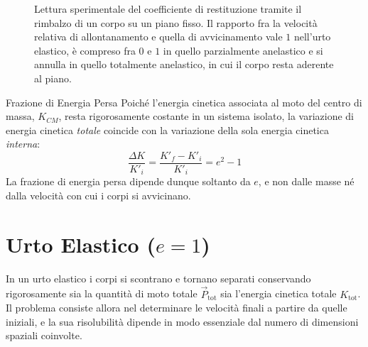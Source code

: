 \begin{figure}[ht]
    \caption{Lettura sperimentale del coefficiente di restituzione tramite il rimbalzo di un corpo su un piano fisso. Il rapporto fra la velocità relativa di allontanamento e quella di avvicinamento vale $1$ nell'urto elastico, è compreso fra $0$ e $1$ in quello parzialmente anelastico e si annulla in quello totalmente anelastico, in cui il corpo resta aderente al piano.}
    \label{fig:tipi_urto}
\end{figure}

\begin{osservazione}{Frazione di Energia Persa}
Poiché l'energia cinetica associata al moto del centro di massa, $K_{CM}$, resta rigorosamente costante in un sistema isolato, la variazione di energia cinetica \emph{totale} coincide con la variazione della sola energia cinetica \emph{interna}:
\begin{equation}
    \frac{\Delta K}{K'_i} = \frac{K'_f - K'_i}{K'_i} = e^2 - 1
\end{equation}
La frazione di energia persa dipende dunque soltanto da $e$, e non dalle masse né dalla velocità con cui i corpi si avvicinano.
\end{osservazione}

\section{Urto Elastico ($e=1$)}

In un urto elastico i corpi si scontrano e tornano separati conservando rigorosamente sia la quantità di moto totale $\vec{P}_{\text{tot}}$ sia l'energia cinetica totale $K_{\text{tot}}$. Il problema consiste allora nel determinare le velocità finali a partire da quelle iniziali, e la sua risolubilità dipende in modo essenziale dal numero di dimensioni spaziali coinvolte.

